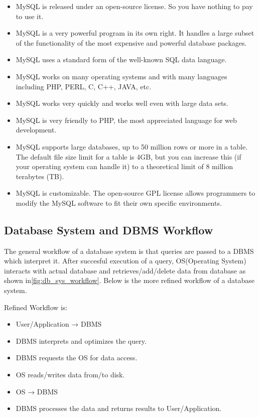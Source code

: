 \documentclass[12pt]{report}
\begin{document}
\begin{itemize}
\item MySQL is released under an open-source license. So you have nothing to pay to use it.
\item MySQL is a very powerful program in its own right. It handles a large subset of the functionality of the most expensive and powerful database packages.
\item MySQL uses a standard form of the well-known SQL data language.
\item MySQL works on many operating systems and with many languages including PHP, PERL, C, C++, JAVA, etc.
\item MySQL works very quickly and works well even with large data sets.
\item MySQL is very friendly to PHP, the most appreciated language for web development.

\item MySQL supports large databases, up to 50 million rows or more in a table. The default file size limit for a table is 4GB, but you can increase this (if your operating system can handle it) to a theoretical limit of 8 million terabytes (TB).

\item MySQL is customizable. The open-source GPL license allows programmers to modify the MySQL software to fit their own specific environments.		
\end{itemize}

\subsection{Database System and DBMS Workflow}
The general workflow of a database system is that queries are passed to a DBMS which interpret it. After succesful execution of a query, OS(Operating System) interacts with actual database and retrieves/add/delete data from database as shown in\ref{fig:db_sys_workflow}. Below is the more refined workflow of a database system. 

Refined Workflow is:
\begin{itemize}
 \item  User/Application → DBMS
 \item DBMS interprets and optimizes the query.
 \item DBMS requests the OS for data access.
 \item OS reads/writes data from/to disk.
 \item OS → DBMS
 \item DBMS processes the data and returns results to User/Application.
\end{itemize}
\end{document}
